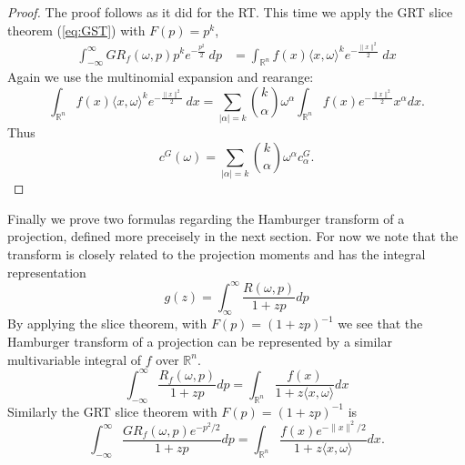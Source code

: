 \documentclass{amsart}
\theoremstyle{remark}
\numberwithin{equation}{section}
\newcommand{\tc}{\textcolor{blue}}
\newcommand{\RR}{\mathbb{R}}
\begin{document}
\begin{proof}
The proof follows as it did for the RT. This time we apply the GRT slice theorem (\ref{eq:GST}) with $F(p) = p^k$, 
\begin{align*}
    \int_{-\infty}^\infty GR_f(\omega, p) p^k e^{-\frac{p^2}2} ~dp
    &= \int_{\RR^n} f(x) \langle x, \omega \rangle^k e^{-\frac{\|x\|^2}2} ~dx
\end{align*}
Again we use the multinomial expansion and rearange:
\[
    \int_{\RR^n} f(x) \langle x, \omega \rangle^k e^{-\frac{\|x\|^2}2} ~dx
    = \sum_{|\alpha| = k} \binom{k}{\alpha} \omega^\alpha \int_{\RR^n} f(x) e^{-\frac{\|x\|^2}2}x^\alpha dx. 
\]
Thus
\[
    c^G(\omega) = \sum_{|\alpha| = k} \binom{k}{\alpha} \omega^\alpha c^G_\alpha.
\]
\end{proof}

Finally we prove two formulas regarding the Hamburger transform of a projection, defined more preceisely in the next section. For now we note that the transform is closely related to the projection moments and has the integral representation
\[
    g(z) = \int_\infty^\infty \frac{R(\omega, p)}{1 + zp} dp
\]
By applying the slice theorem, with $F(p) = (1+zp)^{-1}$ we see that the Hamburger transform of a projection can be represented by a similar multivariable integral of $f$ over $\RR^n$.
\[
    \int_{-\infty}^\infty \frac{R_f(\omega, p)}{1 + zp} dp = \int_{\RR^n} \frac{f(x)}{1 + z\langle x, \omega \rangle} dx
\]
Similarly the GRT slice theorem with $F(p) = (1 + zp)^{-1}$ is
\[
    \int_{-\infty}^\infty \frac{GR_f(\omega, p) e^{-p^2/2}}{1 + zp} dp = \int_{\RR^n} \frac{f(x)e^{-\|x\|^2/2}}{1 + z\langle x, \omega \rangle} dx.
\]


\newpage
\end{document}
